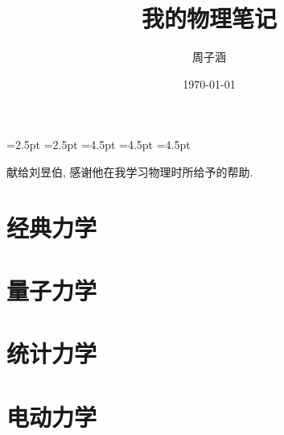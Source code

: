 \documentclass[b5paper,openany]{ctexbook}
\title{我的物理笔记}
\author{周子涵}
\date{\today}
\begin{document}
\maketitle
=2.5pt 
=2.5pt
=4.5pt
=4.5pt
=4.5pt

\vspace*{7cm}
\begin{center}
    {\large 献给刘昱伯, 感谢他在我学习物理时所给予的帮助.}
\end{center}
\frontmatter
\pagestyle{toc} %

\tableofcontents
\pagestyle{plain} %
\mainmatter
\pagestyle{fancy} %
\chapter{经典力学}




\chapter{量子力学}








\chapter{统计力学}





\chapter{电动力学}





\end{document}
